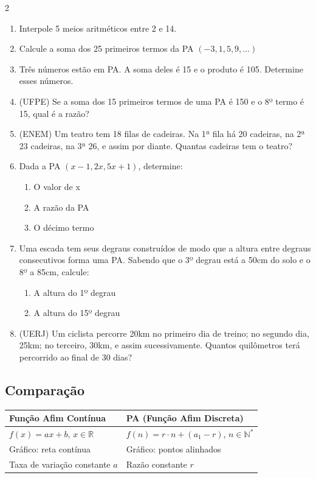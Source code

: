 \documentclass[11pt]{article}
\begin{document}
\begin{multicols}{2}
\begin{enumerate}[leftmargin=*]
\item Interpole 5 meios aritméticos entre 2 e 14.

\item Calcule a soma dos 25 primeiros termos da PA $(-3, 1, 5, 9, \ldots)$

\item Três números estão em PA. A soma deles é 15 e o produto é 105. Determine esses números.

\item (UFPE) Se a soma dos 15 primeiros termos de uma PA é 150 e o 8º termo é 15, qual é a razão?

\item (ENEM) Um teatro tem 18 filas de cadeiras. Na 1ª fila há 20 cadeiras, na 2ª 23 cadeiras, na 3ª 26, e assim por diante. Quantas cadeiras tem o teatro?

\item Dada a PA $(x-1, 2x, 5x+1)$, determine:
\begin{enumerate}[label=\alph*)]
\item O valor de x
\item A razão da PA
\item O décimo termo
\end{enumerate}

\item Uma escada tem seus degraus construídos de modo que a altura entre degraus consecutivos forma uma PA. Sabendo que o 3º degrau está a 50cm do solo e o 8º a 85cm, calcule:
\begin{enumerate}[label=\alph*)]
\item A altura do 1º degrau
\item A altura do 15º degrau
\end{enumerate}

\item (UERJ) Um ciclista percorre 20km no primeiro dia de treino; no segundo dia, 25km; no terceiro, 30km, e assim sucessivamente. Quantos quilômetros terá percorrido ao final de 30 dias?

\end{enumerate}

\subsection*{Comparação}
    {\footnotesize
\begin{tabular}{|l|l|}
\hline
\textbf{Função Afim Contínua} & \textbf{PA (Função Afim Discreta)} \\
\hline
$f(x) = ax + b$, $x \in \mathbb{R}$ & $f(n) = r \cdot n + (a_1 - r)$, $n \in \mathbb{N}^*$ \\
\hline
Gráfico: reta contínua & Gráfico: pontos alinhados \\
\hline
Taxa de variação constante $a$ & Razão constante $r$ \\
\hline
\end{tabular}
    }


\end{multicols}
\end{document}
